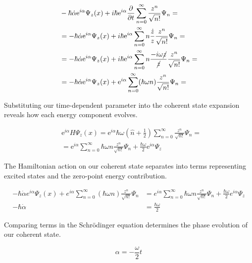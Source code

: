 \documentclass[italian]{HKNdocument}
\begin{document}
\begin{align}
& -\hbar \dot{\alpha} \mathrm{e}^{i \alpha} \Psi_{z}(x)+i \hbar \mathrm{e}^{i \alpha} \frac{\partial}{\partial t} \sum_{n=0}^{\infty} \frac{z^{n}}{\sqrt{n!}} \Psi_{n}= \\
& =-\hbar \dot{\alpha} \mathrm{e}^{i \alpha} \Psi_{z}(x)+i \hbar \mathrm{e}^{i \alpha} \sum_{n=0}^{\infty} n \frac{\dot{z}}{z} \frac{z^{n}}{\sqrt{n!}} \Psi_{n}= \\
& =-\hbar \dot{\alpha} \mathrm{e}^{i \alpha} \Psi_{z}(x)+i \hbar \mathrm{e}^{i \alpha} \sum_{n=0}^{\infty} n \frac{-i \omega \cancel{z}}{\cancel{z}} \frac{z^{n}}{\sqrt{n!}} \Psi_{n}=  \label{eq:7.94}\\
& =-\hbar \dot{\alpha} \mathrm{e}^{i \alpha} \Psi_{z}(x)+\mathrm{e}^{i \alpha} \sum_{n=0}^{\infty}(\hbar \omega n) \frac{z^{n}}{\sqrt{n!}} \Psi_{n}=
\end{align}

Substituting our time-dependent parameter into the coherent state expansion reveals how each energy component evolves.

\begin{align}
& \mathrm{e}^{i \alpha} H \Psi_{z}(x)=\mathrm{e}^{i \alpha} \hbar \omega\left(\hat{n}+\frac{1}{2}\right) \sum_{n=0}^{\infty} \frac{z^{n}}{\sqrt{n!}} \Psi_{n}=  \label{eq:7.95}\\
& =\mathrm{e}^{i \alpha} \sum_{n=0}^{\infty} \hbar \omega n \frac{z^{n}}{\sqrt{n!}} \Psi_{n}+\frac{\hbar \omega}{2} \mathrm{e}^{i \alpha} \Psi_{z}
\end{align}

The Hamiltonian action on our coherent state separates into terms representing excited states and the zero-point energy contribution.

\begin{align}
-\hbar \dot{\alpha} e^{i \alpha} \Psi_{z}(x)+e^{i \alpha} \sum_{n=0}^{\infty}(\hbar \omega n) \frac{z^{n}}{\sqrt{n!}} \Psi_{n} & =e^{i \alpha} \sum_{n=0}^{\infty} \hbar \omega n \frac{z^{n}}{\sqrt{n!}} \Psi_{n}+\frac{\hbar \omega}{2} e^{i \alpha} \Psi_{z}  \label{eq:7.96}\\
-\hbar \dot{\alpha} & =\frac{\hbar \omega}{2}
\end{align}

Comparing terms in the Schrödinger equation determines the phase evolution of our coherent state.

\begin{equation}
\alpha=-\frac{\omega}{2} t \label{eq:7.97}
\end{equation}
\end{document}

